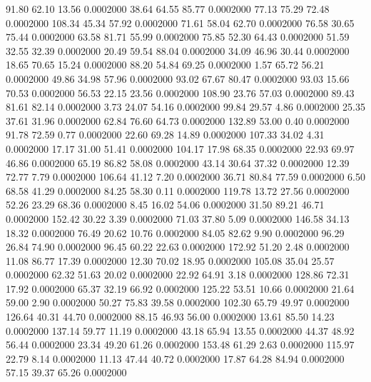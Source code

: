   91.80   62.10   13.56   0.0002000
  38.64   64.55   85.77   0.0002000
  77.13   75.29   72.48   0.0002000
 108.34   45.34   57.92   0.0002000
  71.61   58.04   62.70   0.0002000
  76.58   30.65   75.44   0.0002000
  63.58   81.71   55.99   0.0002000
  75.85   52.30   64.43   0.0002000
  51.59   32.55   32.39   0.0002000
  20.49   59.54   88.04   0.0002000
  34.09   46.96   30.44   0.0002000
  18.65   70.65   15.24   0.0002000
  88.20   54.84   69.25   0.0002000
   1.57   65.72   56.21   0.0002000
  49.86   34.98   57.96   0.0002000
  93.02   67.67   80.47   0.0002000
  93.03   15.66   70.53   0.0002000
  56.53   22.15   23.56   0.0002000
 108.90   23.76   57.03   0.0002000
  89.43   81.61   82.14   0.0002000
   3.73   24.07   54.16   0.0002000
  99.84   29.57    4.86   0.0002000
  25.35   37.61   31.96   0.0002000
  62.84   76.60   64.73   0.0002000
 132.89   53.00    0.40   0.0002000
  91.78   72.59    0.77   0.0002000
  22.60   69.28   14.89   0.0002000
 107.33   34.02    4.31   0.0002000
  17.17   31.00   51.41   0.0002000
 104.17   17.98   68.35   0.0002000
  22.93   69.97   46.86   0.0002000
  65.19   86.82   58.08   0.0002000
  43.14   30.64   37.32   0.0002000
  12.39   72.77    7.79   0.0002000
 106.64   41.12    7.20   0.0002000
  36.71   80.84   77.59   0.0002000
   6.50   68.58   41.29   0.0002000
  84.25   58.30    0.11   0.0002000
 119.78   13.72   27.56   0.0002000
  52.26   23.29   68.36   0.0002000
   8.45   16.02   54.06   0.0002000
  31.50   89.21   46.71   0.0002000
 152.42   30.22    3.39   0.0002000
  71.03   37.80    5.09   0.0002000
 146.58   34.13   18.32   0.0002000
  76.49   20.62   10.76   0.0002000
  84.05   82.62    9.90   0.0002000
  96.29   26.84   74.90   0.0002000
  96.45   60.22   22.63   0.0002000
 172.92   51.20    2.48   0.0002000
  11.08   86.77   17.39   0.0002000
  12.30   70.02   18.95   0.0002000
 105.08   35.04   25.57   0.0002000
  62.32   51.63   20.02   0.0002000
  22.92   64.91    3.18   0.0002000
 128.86   72.31   17.92   0.0002000
  65.37   32.19   66.92   0.0002000
 125.22   53.51   10.66   0.0002000
  21.64   59.00    2.90   0.0002000
  50.27   75.83   39.58   0.0002000
 102.30   65.79   49.97   0.0002000
 126.64   40.31   44.70   0.0002000
  88.15   46.93   56.00   0.0002000
  13.61   85.50   14.23   0.0002000
 137.14   59.77   11.19   0.0002000
  43.18   65.94   13.55   0.0002000
  44.37   48.92   56.44   0.0002000
  23.34   49.20   61.26   0.0002000
 153.48   61.29    2.63   0.0002000
 115.97   22.79    8.14   0.0002000
  11.13   47.44   40.72   0.0002000
  17.87   64.28   84.94   0.0002000
  57.15   39.37   65.26   0.0002000
